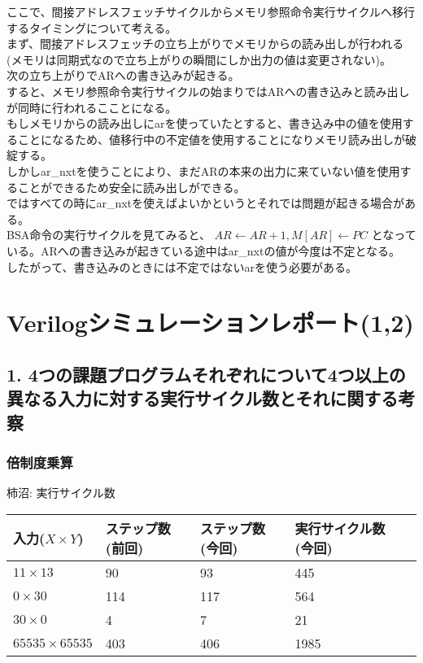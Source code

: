 \documentclass{jsarticle}
\begin{document}
ここで、間接アドレスフェッチサイクルからメモリ参照命令実行サイクルへ移行するタイミングについて考える。\\
まず、間接アドレスフェッチの立ち上がりでメモリからの読み出しが行われる(メモリは同期式なので立ち上がりの瞬間にしか出力の値は変更されない)。\\
次の立ち上がりでARへの書き込みが起きる。\\
すると、メモリ参照命令実行サイクルの始まりではARへの書き込みと読み出しが同時に行われるこことになる。\\
もしメモリからの読み出しにarを使っていたとすると、書き込み中の値を使用することになるため、値移行中の不定値を使用することになりメモリ読み出しが破綻する。\\
しかしar\_nxtを使うことにより、まだARの本来の出力に来ていない値を使用することができるため安全に読み出しができる。\\

ではすべての時にar\_nxtを使えばよいかというとそれでは問題が起きる場合がある。\\
BSA命令の実行サイクルを見てみると、
$AR \leftarrow AR + 1, M[AR] \leftarrow PC$
となっている。ARへの書き込みが起きている途中はar\_nxtの値が今度は不定となる。\\
したがって、書き込みのときには不定ではないarを使う必要がある。

\section*{Verilogシミュレーションレポート(1,2)}

\subsection*{1. 4つの課題プログラムそれぞれについて4つ以上の異なる入力に対する実行サイクル数とそれに関する考察}

\subsubsection*{倍制度乗算}
柿沼:
実行サイクル数
\begin{table}[h]
  \begin{tabular}{|l|l|l|l|l|} \hline
    入力($X \times Y$) & ステップ数(前回) & ステップ数(今回) & 実行サイクル数(今回) \\ \hline
    $11 \times 13$ & 90 & 93 & 445\\ \hline
    $0 \times 30$ & 114 & 117 & 564 \\ \hline
    $30 \times 0$ & 4 & 7 & 21\\ \hline
    $65535 \times 65535$ & 403 & 406 & 1985 \\ \hline
  \end{tabular}
\end{table}
\end{document}
